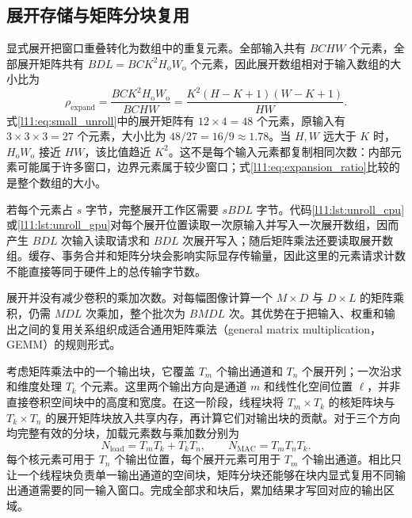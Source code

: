 \subsection{展开存储与矩阵分块复用}
\label{l11:subsec:unroll_cost}

显式展开把窗口重叠转化为数组中的重复元素。全部输入共有 $BCHW$ 个元素，全部展开矩阵共有 $BDL=BCK^2H_{\mathrm{o}}W_{\mathrm{o}}$ 个元素，因此展开数组相对于输入数组的大小比为
\begin{equation}
  \rho_{\mathrm{expand}}
  =\frac{BCK^2H_{\mathrm{o}}W_{\mathrm{o}}}{BCHW}
  =\frac{K^2(H-K+1)(W-K+1)}{HW}.
  \label{l11:eq:expansion_ratio}
\end{equation}
式\eqref{l11:eq:small_unroll}中的展开矩阵有 $12\times4=48$ 个元素，原输入有 $3\times3\times3=27$ 个元素，大小比为 $48/27=16/9\approx1.78$。当 $H,W$ 远大于 $K$ 时，$H_{\mathrm{o}}W_{\mathrm{o}}$ 接近 $HW$，该比值趋近 $K^2$。这不是每个输入元素都复制相同次数：内部元素可能属于许多窗口，边界元素属于较少窗口；式\eqref{l11:eq:expansion_ratio}比较的是整个数组的大小。

若每个元素占 $s$ 字节，完整展开工作区需要 $sBDL$ 字节。代码\ref{l11:lst:unroll_cpu}或\ref{l11:lst:unroll_gpu}对每个展开位置读取一次原输入并写入一次展开数组，因而产生 $BDL$ 次输入读取请求和 $BDL$ 次展开写入；随后矩阵乘法还要读取展开数组。缓存、事务合并和矩阵分块会影响实际显存传输量，因此这里的元素请求计数不能直接等同于硬件上的总传输字节数。

展开并没有减少卷积的乘加次数。对每幅图像计算一个 $M\times D$ 与 $D\times L$ 的矩阵乘积，仍需 $MDL$ 次乘加，整个批次为 $BMDL$ 次。其优势在于把输入、权重和输出之间的复用关系组织成适合通用矩阵乘法（general matrix multiplication，GEMM）的规则形式。

考虑矩阵乘法中的一个输出块，它覆盖 $T_m$ 个输出通道和 $T_n$ 个展开列；一次沿求和维度处理 $T_k$ 个元素。这里两个输出方向是通道 $m$ 和线性化空间位置 $\ell$，并非直接卷积空间块中的高度和宽度。在这一阶段，线程块将 $T_m\times T_k$ 的核矩阵块与 $T_k\times T_n$ 的展开矩阵块放入共享内存，再计算它们对输出块的贡献。对于三个方向均完整有效的分块，加载元素数与乘加数分别为
\begin{equation}
  N_{\mathrm{load}}=T_mT_k+T_kT_n,
  \qquad
  N_{\mathrm{MAC}}=T_mT_nT_k.
  \label{l11:eq:gemm_tile_reuse}
\end{equation}
每个核元素可用于 $T_n$ 个输出位置，每个展开元素可用于 $T_m$ 个输出通道。相比只让一个线程块负责单一输出通道的空间块，矩阵分块还能够在块内显式复用不同输出通道需要的同一输入窗口。完成全部求和块后，累加结果才写回对应的输出区域。

